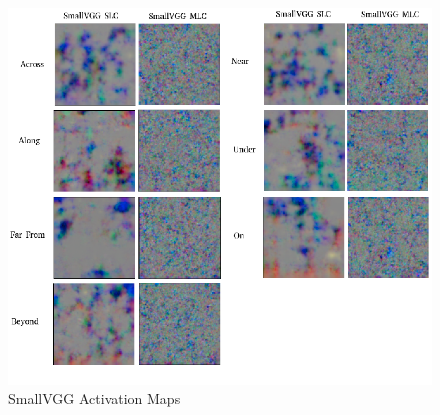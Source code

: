 \documentclass{csfyp}
\begin{document}
\begin{figure}[!htbp]
	\includegraphics[scale=0.60,center]{Small_Spatial_2.pdf}
	\caption{SmallVGG Activation Maps}
\end{figure}
\end{document}
